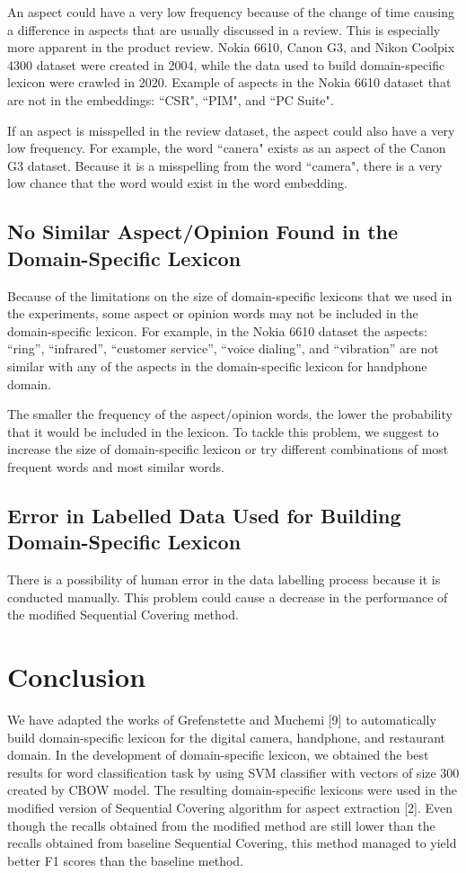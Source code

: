 \documentclass[a4paper,conference]{IEEEtran}
\begin{document}
An aspect could have a very low frequency because of the change of time causing a difference in aspects that are usually discussed in a review. This is especially more apparent in the product review. Nokia 6610, Canon G3, and Nikon Coolpix 4300 dataset were created in 2004, while the data used to build domain-specific lexicon were crawled in 2020. Example of aspects in the Nokia 6610 dataset that are not in the embeddings: ``CSR", ``PIM", and ``PC Suite".

If an aspect is misspelled in the review dataset, the aspect could also have a very low frequency. For example, the word ``canera" exists as an aspect of the Canon G3 dataset. Because it is a misspelling from the word ``camera", there is a very low chance that the word would exist in the word embedding.

\subsection{No Similar Aspect/Opinion Found in the Domain-Specific Lexicon}
Because of the limitations on the size of domain-specific lexicons that we used in the experiments, some aspect or opinion words may not be included in the domain-specific lexicon. For example, in the Nokia 6610 dataset the aspects: “ring”, “infrared”, “customer service”, “voice dialing”, and “vibration” are not similar with any of the aspects in the domain-specific lexicon for handphone domain.

The smaller the frequency of the aspect/opinion words, the lower the probability that it would be included in the lexicon. To tackle this problem, we suggest to increase the size of domain-specific lexicon or try different combinations of most frequent words and most similar words.

\subsection{Error in Labelled Data Used for Building Domain-Specific Lexicon}
There is a possibility of human error in the data labelling process because it is conducted manually. This problem could cause a decrease in the performance of the modified Sequential Covering method.


\section{Conclusion}
We have adapted the works of Grefenstette and Muchemi [9] to automatically build domain-specific lexicon for the digital camera, handphone, and restaurant domain. In the development of domain-specific lexicon, we obtained the best results for word classification task by using SVM classifier with vectors of size 300 created by CBOW model. The resulting domain-specific lexicons were used in the modified version of Sequential Covering algorithm for aspect extraction [2]. Even though the recalls obtained from the modified method are still lower than the recalls obtained from baseline Sequential Covering, this method managed to yield better F1 scores than the baseline method.
\end{document}
